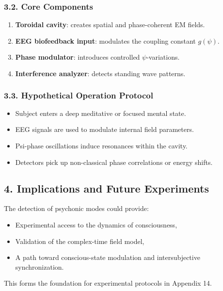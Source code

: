 \subsubsection*{3.2. Core Components}

\begin{enumerate}
  \item \textbf{Toroidal cavity}: creates spatial and phase-coherent EM fields.
  \item \textbf{EEG biofeedback input}: modulates the coupling constant \(g(\psi)\).
  \item \textbf{Phase modulator}: introduces controlled \(\psi\)-variations.
  \item \textbf{Interference analyzer}: detects standing wave patterns.
\end{enumerate}

\subsubsection*{3.3. Hypothetical Operation Protocol}

\begin{itemize}
  \item Subject enters a deep meditative or focused mental state.
  \item EEG signals are used to modulate internal field parameters.
  \item Psi-phase oscillations induce resonances within the cavity.
  \item Detectors pick up non-classical phase correlations or energy shifts.
\end{itemize}

\subsection*{4. Implications and Future Experiments}

The detection of psychonic modes could provide:
\begin{itemize}
  \item Experimental access to the dynamics of consciousness,
  \item Validation of the complex-time field model,
  \item A path toward conscious-state modulation and intersubjective synchronization.
\end{itemize}

This forms the foundation for experimental protocols in Appendix 14.

